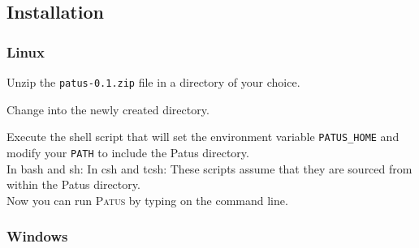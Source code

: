 \subsection{Installation}

\subsubsection{Linux}

Unzip the \texttt{patus-0.1.zip} file in a directory of your choice.

\noindent Change into the newly created directory.

\noindent Execute the shell script that will set the environment variable
\texttt{PATUS\_HOME} and modify your \texttt{PATH} to include the Patus directory.\\
In bash and sh: 
In csh and tcsh: 
These scripts assume that they are sourced from within the Patus directory.\\[2pt]

\noindent Now you can run \textsc{Patus} by typing
 on the command line.

\subsubsection{Windows}
